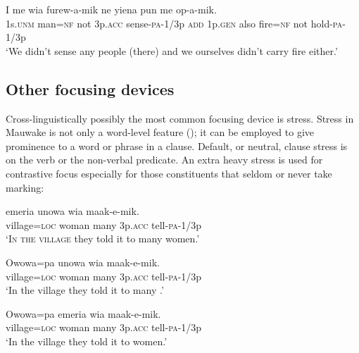 \ea%
\label{ex:x1738}
\gll I    me  wia  furew-a-mik  ne  yiena  pun   me  op-a-mik. \\
1s.\textsc{unm}  man=\textsc{nf}  not  3p.\textsc{acc}  sense-\textsc{pa}-1/3p  \textsc{add}  1p.\textsc{gen}  also fire=\textsc{nf}  not  hold-\textsc{pa}-1/3p     \\
\glt`We didn't sense any people (there) and we ourselves didn't carry fire either.'
\z


\subsection{Other focusing devices}

Cross-linguistically possibly the most common focusing device is stress. Stress in Mauwake is not only a word-level feature (); it can be employed to give prominence to a word or phrase in a clause. Default, or neutral, clause stress is on the verb or the non-verbal predicate. An extra heavy stress is used for contrastive focus especially for those constituents that seldom or never take  marking:  

\ea%
\label{ex:x1739}
\gll {}\textstyleEmphasizedVernacularWords{{{\textprimstress}}}  emeria  unowa  wia  maak-e-mik. \\
village=\textsc{loc}  woman  many  3p.\textsc{acc}  tell-\textsc{pa}-1/3p      \\
\glt`\textsc{In the village} they told it to many women.'
\z


\ea%
\label{ex:x1740}
\gll Owowa=pa  \textstyleEmphasizedVernacularWords{{{\textprimstress}}}  unowa  wia  maak-e-mik. \\
village=\textsc{loc}  woman  many  3p.\textsc{acc}  tell-\textsc{pa}-1/3p      \\
\glt`In the village they told it to many .'
\z


\ea%
\label{ex:x1741}
\gll Owowa=pa  emeria  \textstyleEmphasizedVernacularWords{{{\textprimstress}}}  wia  maak-e-mik. \\
village=\textsc{loc}  woman  many  3p.\textsc{acc}  tell-\textsc{pa}-1/3p      \\
\glt`In the village they told it to  women.'
\z


